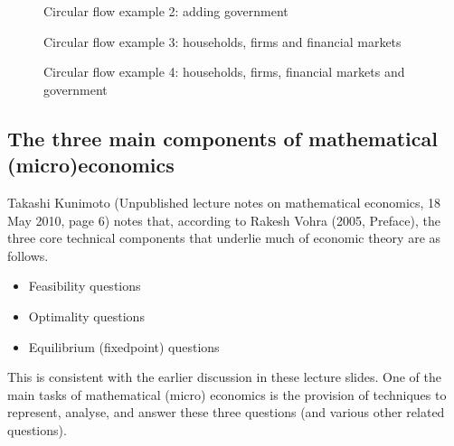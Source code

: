 \documentclass[letterpaper,10pt,english]{jupyterBook}
\begin{document}
\begin{figure}[htbp]
\centering
\capstart

\noindent{}
\caption{Circular flow example 2: adding government}\label{\detokenize{01.intro_to_economics:id6}}\end{figure}

\begin{figure}[htbp]
\centering
\capstart

\noindent{}
\caption{Circular flow example 3: households, firms and financial markets}\label{\detokenize{01.intro_to_economics:id7}}\end{figure}

\begin{figure}[htbp]
\centering
\capstart

\noindent{}
\caption{Circular flow example 4: households, firms, financial markets and government}\label{\detokenize{01.intro_to_economics:id8}}\end{figure}


\subsection{The three main components of mathematical (micro\sphinxhyphen{})economics}
\label{\detokenize{01.intro_to_economics:the-three-main-components-of-mathematical-micro-economics}}
\sphinxAtStartPar
Takashi Kunimoto (Unpublished lecture notes on mathematical economics, 18 May 2010, page 6) notes that, according to Rakesh Vohra (2005, Preface), the three core technical components that underlie much of economic theory are as follows.
\begin{itemize}
\item {} 
\sphinxAtStartPar
Feasibility questions

\item {} 
\sphinxAtStartPar
Optimality questions

\item {} 
\sphinxAtStartPar
Equilibrium (fixed\sphinxhyphen{}point) questions

\end{itemize}

\sphinxAtStartPar
This is consistent with the earlier discussion in these lecture slides. One of the main tasks of mathematical (micro\sphinxhyphen{}) economics is the provision of techniques to represent, analyse, and answer these three questions (and various other related questions).
\end{document}
